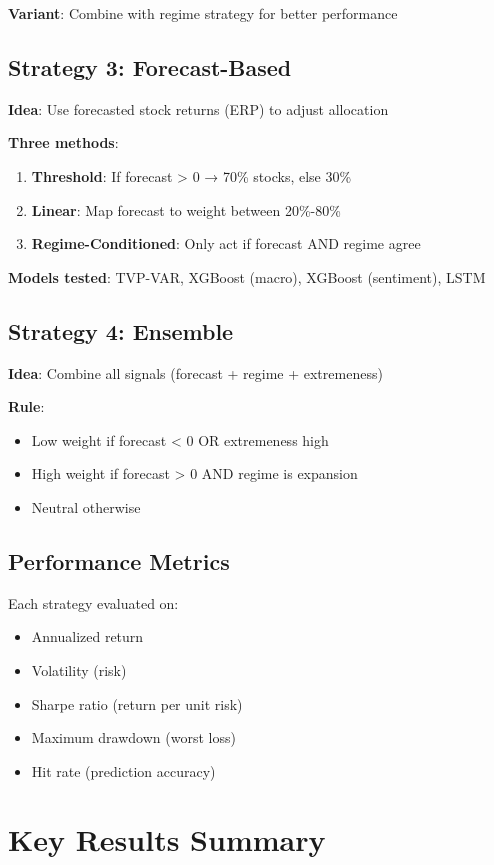 \documentclass[11pt,a4paper]{article}
\begin{document}
\textbf{Variant}: Combine with regime strategy for better performance

\subsection{Strategy 3: Forecast-Based}
\textbf{Idea}: Use forecasted stock returns (ERP) to adjust allocation

\textbf{Three methods}:
\begin{enumerate}
    \item \textbf{Threshold}: If forecast > 0 → 70\% stocks, else 30\%
    \item \textbf{Linear}: Map forecast to weight between 20\%-80\%
    \item \textbf{Regime-Conditioned}: Only act if forecast AND regime agree
\end{enumerate}

\textbf{Models tested}: TVP-VAR, XGBoost (macro), XGBoost (sentiment), LSTM

\subsection{Strategy 4: Ensemble}
\textbf{Idea}: Combine all signals (forecast + regime + extremeness)

\textbf{Rule}: 
\begin{itemize}
    \item Low weight if forecast < 0 OR extremeness high
    \item High weight if forecast > 0 AND regime is expansion
    \item Neutral otherwise
\end{itemize}

\subsection{Performance Metrics}
Each strategy evaluated on:
\begin{itemize}
    \item Annualized return
    \item Volatility (risk)
    \item Sharpe ratio (return per unit risk)
    \item Maximum drawdown (worst loss)
    \item Hit rate (prediction accuracy)
\end{itemize}

\section{Key Results Summary}
\end{document}
